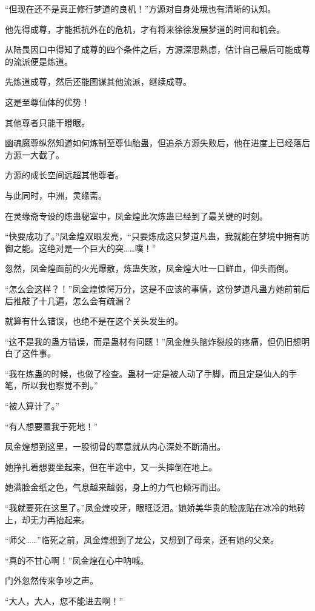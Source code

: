 \begin{this_body}
“但现在还不是真正修行梦道的良机！”方源对自身处境也有清晰的认知。

他先得成尊，才能抵抗外在的危机，才有将来徐徐发展梦道的时间和机会。

从陆畏因口中得知了成尊的四个条件之后，方源深思熟虑，估计自己最后可能成尊的流派便是炼道。

先炼道成尊，然后还能图谋其他流派，继续成尊。

这是至尊仙体的优势！

其他尊者只能干瞪眼。

幽魂魔尊纵然知道如何炼制至尊仙胎蛊，但追杀方源失败后，他在进度上已经落后方源一大截了。

方源的成长空间远超其他尊者。

与此同时，中洲，灵缘斋。

在灵缘斋专设的炼蛊秘室中，凤金煌此次炼蛊已经到了最关键的时刻。

“快要成功了。”凤金煌双眼发亮，“只要炼成这只梦道凡蛊，我就能在梦境中拥有防御之能。这绝对是一个巨大的突……噗！”

忽然，凤金煌面前的火光爆散，炼蛊失败，凤金煌大吐一口鲜血，仰头而倒。

“怎么会这样？！”凤金煌惊愕万分，这是不应该的事情，这份梦道凡蛊方她前前后后推敲了十几遍，怎么会有疏漏？

就算有什么错误，也绝不是在这个关头发生的。

“这不是我的蛊方错误，而是蛊材有问题！”凤金煌头脑炸裂般的疼痛，但仍旧想明白了这件事。

“我在炼蛊的时候，也做了检查。蛊材一定是被人动了手脚，而且定是仙人的手笔，所以我也察觉不到。”

“被人算计了。”

“有人想要置我于死地！”

凤金煌想到这里，一股彻骨的寒意就从内心深处不断涌出。

她挣扎着想要坐起来，但在半途中，又一头摔倒在地上。

她满脸金纸之色，气息越来越弱，身上的力气也倾泻而出。

“我就要死在这里了。”凤金煌咬牙，眼眶泛泪。她娇美华贵的脸庞贴在冰冷的地砖上，却无力再抬起来。

“师父……”临死之前，凤金煌想到了龙公，又想到了母亲，还有她的父亲。

“真的不甘心啊！”凤金煌在心中呐喊。

门外忽然传来争吵之声。

“大人，大人，您不能进去啊！”


\end{this_body}
